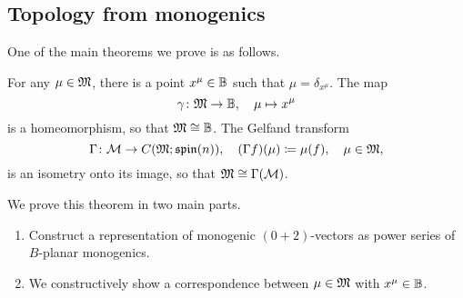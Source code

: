 \subsection{Topology from monogenics}

One of the main theorems we prove is as follows.

\begin{theorem}
For any $\mu \in \mathfrak{M}$, there is a point $x^\mu \in \mathbb{B}$ such that $\mu = \delta_{x^\mu}$. The map
\[
\gamma \colon \mathfrak{M} \to \mathbb{B}, \quad \mu \mapsto x^\mu
\]
is a homeomorphism, so that $\mathfrak{M} \cong \mathbb{B}$. The Gelfand transform
\[
\Gamma \colon \mathcal{M} \to C(\mathfrak{M}; \mathfrak{spin}(n)), \quad (\Gamma f)(\mu) \coloneqq \mu(f), \quad \mu \in \mathfrak{M},
\]
is an isometry onto its image, so that $\mathfrak{M} \cong \Gamma(\mathcal{M})$.
\end{theorem}

We prove this theorem in two main parts. 

\begin{enumerate}[1.]
    \item Construct a representation of monogenic $(0+2)$-vectors as power series of $B$-planar monogenics.
    \item We constructively show a correspondence between $\mu \in \mathfrak{M}$ with $x^\mu \in \mathbb{B}$.  
\end{enumerate} 

